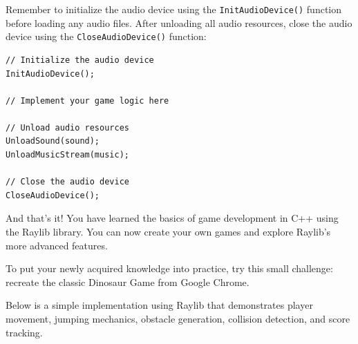 Remember to initialize the audio device using the \texttt{InitAudioDevice()} function before loading any audio files. After unloading all audio resources, close the audio device using the \texttt{CloseAudioDevice()} function:
\begin{verbatim}
// Initialize the audio device
InitAudioDevice();

// Implement your game logic here

// Unload audio resources
UnloadSound(sound);
UnloadMusicStream(music);

// Close the audio device
CloseAudioDevice();
\end{verbatim}

And that's it! You have learned the basics of game development in C++ using the Raylib library. You can now create your own games and explore Raylib's more advanced features.

To put your newly acquired knowledge into practice, try this small challenge: recreate the classic Dinosaur Game from Google Chrome.

Below is a simple implementation using Raylib that demonstrates player movement, jumping mechanics, obstacle generation, collision detection, and score tracking.

